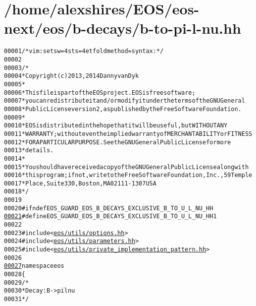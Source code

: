 \hypertarget{b-to-pi-l-nu_8hh_source}{
\section{/home/alexshires/EOS/eos-\/next/eos/b-\/decays/b-\/to-\/pi-\/l-\/nu.hh}
}


\begin{footnotesize}\begin{alltt}
00001 \textcolor{comment}{/* vim: set sw=4 sts=4 et foldmethod=syntax : */}
00002 
00003 \textcolor{comment}{/*}
00004 \textcolor{comment}{ * Copyright (c) 2013, 2014 Danny van Dyk}
00005 \textcolor{comment}{ *}
00006 \textcolor{comment}{ * This file is part of the EOS project. EOS is free software;}
00007 \textcolor{comment}{ * you can redistribute it and/or modify it under the terms of the GNU General}
00008 \textcolor{comment}{ * Public License version 2, as published by the Free Software Foundation.}
00009 \textcolor{comment}{ *}
00010 \textcolor{comment}{ * EOS is distributed in the hope that it will be useful, but WITHOUT ANY}
00011 \textcolor{comment}{ * WARRANTY; without even the implied warranty of MERCHANTABILITY or FITNESS}
00012 \textcolor{comment}{ * FOR A PARTICULAR PURPOSE.  See the GNU General Public License for more}
00013 \textcolor{comment}{ * details.}
00014 \textcolor{comment}{ *}
00015 \textcolor{comment}{ * You should have received a copy of the GNU General Public License along with}
00016 \textcolor{comment}{ * this program; if not, write to the Free Software Foundation, Inc., 59 Temple}
00017 \textcolor{comment}{ * Place, Suite 330, Boston, MA  02111-1307  USA}
00018 \textcolor{comment}{ */}
00019 
00020 \textcolor{preprocessor}{#ifndef EOS\_GUARD\_EOS\_B\_DECAYS\_EXCLUSIVE\_B\_TO\_U\_L\_NU\_HH}
\hypertarget{b-to-pi-l-nu_8hh_source_l00021}{}\hyperlink{b-to-pi-l-nu_8hh_a930cd2713bbe38b25f42dcc307d9da2e}{00021} \textcolor{preprocessor}{}\textcolor{preprocessor}{#define EOS\_GUARD\_EOS\_B\_DECAYS\_EXCLUSIVE\_B\_TO\_U\_L\_NU\_HH 1}
00022 \textcolor{preprocessor}{}
00023 \textcolor{preprocessor}{#include <\hyperlink{options_8hh}{eos/utils/options.hh}>}
00024 \textcolor{preprocessor}{#include <\hyperlink{parameters_8hh}{eos/utils/parameters.hh}>}
00025 \textcolor{preprocessor}{#include <\hyperlink{private__implementation__pattern_8hh}{eos/utils/private_implementation_pattern.hh}>}
00026 
\hypertarget{b-to-pi-l-nu_8hh_source_l00027}{}\hyperlink{namespaceeos}{00027} \textcolor{keyword}{namespace }eos
00028 \{
00029     \textcolor{comment}{/*}
00030 \textcolor{comment}{     * Decay: B -> pi l nu}
00031 \textcolor{comment}{     */}

\end{alltt}
\end{footnotesize}
